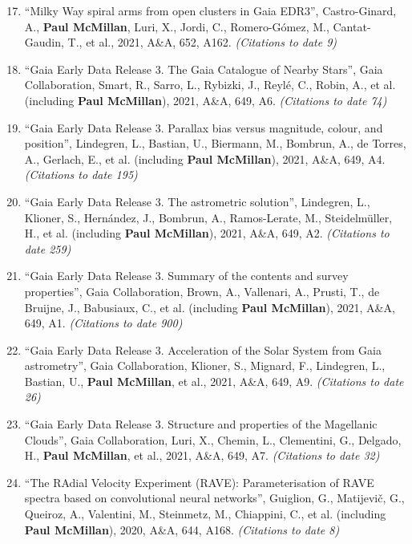 \documentclass{resume}
\begin{document}
\begin{enumerate}
\setcounter{enumi}{16}
\item ``Milky Way spiral arms from open clusters in Gaia EDR3'', Castro-Ginard, A., \textbf{Paul McMillan}, Luri, X., Jordi, C., Romero-G\'omez, M., Cantat-Gaudin, T., et al., 2021, A\&A, 652, A162. \textit{(Citations to date 9)}

\item ``Gaia Early Data Release 3. The Gaia Catalogue of Nearby Stars'', Gaia Collaboration, Smart, R., Sarro, L., Rybizki, J., Reyl\'e, C., Robin, A., et al. (including \textbf{Paul McMillan}), 2021, A\&A, 649, A6. \textit{(Citations to date 74)}

\item ``Gaia Early Data Release 3. Parallax bias versus magnitude, colour, and position'', Lindegren, L., Bastian, U., Biermann, M., Bombrun, A., de Torres, A., Gerlach, E., et al. (including \textbf{Paul McMillan}), 2021, A\&A, 649, A4. \textit{(Citations to date 195)}

\item ``Gaia Early Data Release 3. The astrometric solution'', Lindegren, L., Klioner, S., Hern\'andez, J., Bombrun, A., Ramos-Lerate, M., Steidelm\"uller, H., et al. (including \textbf{Paul McMillan}), 2021, A\&A, 649, A2. \textit{(Citations to date 259)}

\item ``Gaia Early Data Release 3. Summary of the contents and survey properties'', Gaia Collaboration, Brown, A., Vallenari, A., Prusti, T., de Bruijne, J., Babusiaux, C., et al. (including \textbf{Paul McMillan}), 2021, A\&A, 649, A1. \textit{(Citations to date 900)}

\item ``Gaia Early Data Release 3. Acceleration of the Solar System from Gaia astrometry'', Gaia Collaboration, Klioner, S., Mignard, F., Lindegren, L., Bastian, U., \textbf{Paul McMillan}, et al., 2021, A\&A, 649, A9. \textit{(Citations to date 26)}

\item ``Gaia Early Data Release 3. Structure and properties of the Magellanic Clouds'', Gaia Collaboration, Luri, X., Chemin, L., Clementini, G., Delgado, H., \textbf{Paul McMillan}, et al., 2021, A\&A, 649, A7. \textit{(Citations to date 32)}

\item ``The RAdial Velocity Experiment (RAVE): Parameterisation of RAVE spectra based on convolutional neural networks'', Guiglion, G., Matijevi\v{c}, G., Queiroz, A., Valentini, M., Steinmetz, M., Chiappini, C., et al. (including \textbf{Paul McMillan}), 2020, A\&A, 644, A168. \textit{(Citations to date 8)}


\end{enumerate}
\end{document}
